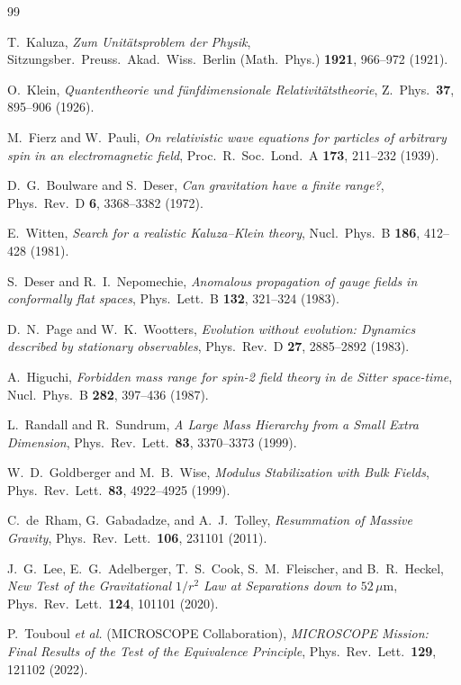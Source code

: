 \documentclass[11pt,a4paper]{article}
\theoremstyle{plain}
\theoremstyle{remark}
\begin{document}
\clearpage
\begin{thebibliography}{99}

T.~Kaluza, \emph{Zum Unit\"atsproblem der Physik}, Sitzungsber.\ Preuss.\ Akad.\ Wiss.\ Berlin (Math.\ Phys.) \textbf{1921}, 966--972 (1921).

O.~Klein, \emph{Quantentheorie und f\"unfdimensionale Relativit\"atstheorie}, Z.\ Phys.\ \textbf{37}, 895--906 (1926).

M.~Fierz and W.~Pauli, \emph{On relativistic wave equations for particles of arbitrary spin in an electromagnetic field}, Proc.\ R.\ Soc.\ Lond.\ A \textbf{173}, 211--232 (1939).

D.~G.~Boulware and S.~Deser, \emph{Can gravitation have a finite range?}, Phys.\ Rev.\ D \textbf{6}, 3368--3382 (1972).

E.~Witten, \emph{Search for a realistic Kaluza--Klein theory}, Nucl.\ Phys.\ B \textbf{186}, 412--428 (1981).

S.~Deser and R.~I.~Nepomechie, \emph{Anomalous propagation of gauge fields in conformally flat spaces}, Phys.\ Lett.\ B \textbf{132}, 321--324 (1983).

D.~N.~Page and W.~K.~Wootters, \emph{Evolution without evolution: Dynamics described by stationary observables}, Phys.\ Rev.\ D \textbf{27}, 2885--2892 (1983).

A.~Higuchi, \emph{Forbidden mass range for spin-2 field theory in de Sitter space-time}, Nucl.\ Phys.\ B \textbf{282}, 397--436 (1987).

L.~Randall and R.~Sundrum, \emph{A Large Mass Hierarchy from a Small Extra Dimension}, Phys.\ Rev.\ Lett.\ \textbf{83}, 3370--3373 (1999).

W.~D.~Goldberger and M.~B.~Wise, \emph{Modulus Stabilization with Bulk Fields}, Phys.\ Rev.\ Lett.\ \textbf{83}, 4922--4925 (1999).

C.~de~Rham, G.~Gabadadze, and A.~J.~Tolley, \emph{Resummation of Massive Gravity}, Phys.\ Rev.\ Lett.\ \textbf{106}, 231101 (2011).

J.~G.~Lee, E.~G.~Adelberger, T.~S.~Cook, S.~M.~Fleischer, and B.~R.~Heckel, \emph{New Test of the Gravitational $1/r^2$ Law at Separations down to $52\,\mu\mathrm{m}$}, Phys.\ Rev.\ Lett.\ \textbf{124}, 101101 (2020).

P.~Touboul \emph{et al.} (MICROSCOPE Collaboration), \emph{MICROSCOPE Mission: Final Results of the Test of the Equivalence Principle}, Phys.\ Rev.\ Lett.\ \textbf{129}, 121102 (2022).

\end{thebibliography}
\end{document}
